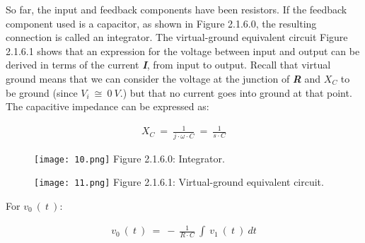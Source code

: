 So far, the input and feedback components have been resistors. If the feedback component used is a capacitor, as shown in Figure 2.1.6.0, the resulting connection is called an integrator. The virtual-ground equivalent circuit Figure 2.1.6.1 shows that an expression for the voltage between input and output can be derived in terms of the current {\bfseries\itshape I}, from input to output. Recall that virtual ground means that we can consider the voltage at the junction of {\bfseries\itshape R} and {\bfseries\itshape $X_{C}$} to be ground (since $V_{i}\ \cong\ 0\ V$.) but that no current goes into ground at that point. The capacitive impedance can be expressed as: \hfill \break

\begin{ceqn}
\begin{align*}
X_{C}\ =\ \frac{1}{j \cdot \omega \cdot C}\ =\ \frac{1}{s \cdot C}
\end{align*}
\end{ceqn} \hfill

\begin{multicols}{2}
\begin{figure}[H]
\texttt{[image: 10.png]}
\centering \linebreak \linebreak Figure 2.1.6.0: Integrator.
\end{figure}

\begin{figure}[H]
\texttt{[image: 11.png]}
\centering \linebreak \linebreak Figure 2.1.6.1: Virtual-ground equivalent circuit.
\end{figure}
\end{multicols} \hfill

For $v_{0}\ (\ t\ )$: \hfill \break

\begin{ceqn}
\begin{align*}
v_{0}\ (\ t\ )\ =\ -\ \frac{1}{R \cdot C}\ \int\ v_{1}\ (\ t\ )\ dt
\end{align*}
\end{ceqn} \hfill

\pagebreak
